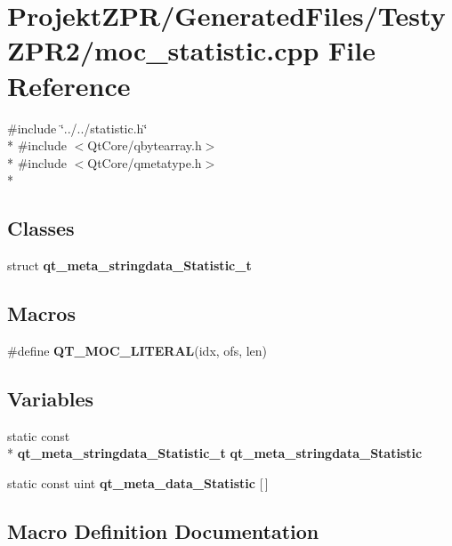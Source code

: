 \section{Projekt\-Z\-P\-R/\-Generated\-Files/\-Testy\-Z\-P\-R2/moc\-\_\-statistic.cpp File Reference}
\label{_testy_z_p_r2_2moc__statistic_8cpp}
{\ttfamily \#include \char`\"{}../../statistic.\-h\char`\"{}}\\*
{\ttfamily \#include $<$Qt\-Core/qbytearray.\-h$>$}\\*
{\ttfamily \#include $<$Qt\-Core/qmetatype.\-h$>$}\\*
\subsection*{Classes}
\begin{DoxyCompactItemize}
\item 
struct {\bf qt\-\_\-meta\-\_\-stringdata\-\_\-\-Statistic\-\_\-t}
\end{DoxyCompactItemize}
\subsection*{Macros}
\begin{DoxyCompactItemize}
\item 
\#define {\bf Q\-T\-\_\-\-M\-O\-C\-\_\-\-L\-I\-T\-E\-R\-A\-L}(idx, ofs, len)
\end{DoxyCompactItemize}
\subsection*{Variables}
\begin{DoxyCompactItemize}
\item 
static const \\*
{\bf qt\-\_\-meta\-\_\-stringdata\-\_\-\-Statistic\-\_\-t} {\bf qt\-\_\-meta\-\_\-stringdata\-\_\-\-Statistic}
\item 
static const uint {\bf qt\-\_\-meta\-\_\-data\-\_\-\-Statistic} [$\,$]
\end{DoxyCompactItemize}


\subsection{Macro Definition Documentation}
